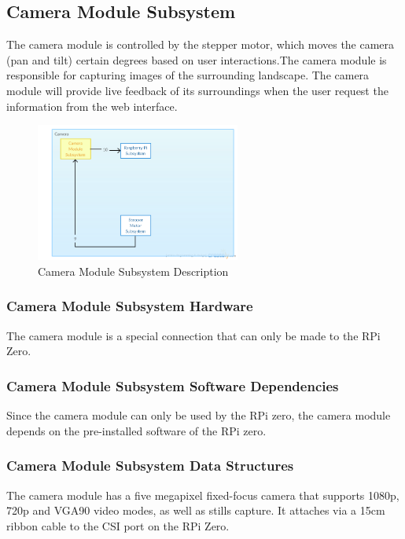 \subsection{Camera Module Subsystem}
The camera module is controlled by the stepper motor, which moves the camera (pan and tilt) certain degrees based on user interactions.The camera module is responsible for capturing images of the surrounding landscape. The camera module will provide live feedback of its surroundings when the user request the information from the web interface.

\begin{figure}[h!] 
 	\centering 
  	\includegraphics[width=0.60\textwidth]{images/ADSdiagrams/cameramodulesubsystem.png} 
 \caption{Camera Module Subsystem Description} 
\end{figure}

\subsubsection{Camera Module Subsystem Hardware}
The camera module is a special connection that can only be made to the RPi Zero.


\subsubsection{Camera Module Subsystem Software Dependencies}
Since the camera module can only be used by the RPi zero, the camera module depends on the pre-installed software of the RPi zero.


\subsubsection{Camera Module Subsystem Data Structures}
The camera module has a five megapixel fixed-focus camera that supports 1080p, 720p and VGA90 video modes, as well as stills capture. It attaches via a 15cm ribbon cable to the CSI port on the RPi Zero.
